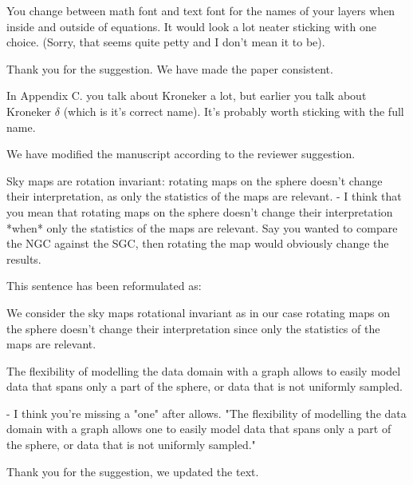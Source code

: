 \documentclass[12pt,a4paper]{article}
\newcommand{\nati}[1]{{\color[rgb]{.1,.6,.1}{NP: #1}}}
\newcommand{\1}{\b{1}}              %
\newcommand{\0}{\b{0}}              %
\begin{document}
\begin{mdframed}[style=comment]
You change between math font and text font for the names of your layers when inside and outside of equations. It would look a lot neater sticking with one choice. (Sorry, that seems quite petty and I don't mean it to be).
\end{mdframed}
Thank you for the suggestion. We have made the paper consistent.
\nati{@all, when you read the paper, please check that I did not forget some of them. Every layer has been changed to math symbols as we use them like function. For example, SM becomes $SM$.}

\begin{mdframed}[style=comment]
In Appendix C. you talk about Kroneker a lot, but earlier you talk about Kroneker $\delta$ (which is it's correct name). It's probably worth sticking with the full name.
\end{mdframed}
We have modified the manuscript according to the reviewer suggestion.

\begin{mdframed}[style=comment]
Sky maps are rotation invariant: rotating maps on the sphere doesn’t change their interpretation, as only the statistics of the maps are relevant.
- I think that you mean that rotating maps on the sphere doesn't change their interpretation *when* only the statistics of the maps are relevant. Say you wanted to compare the NGC against the SGC, then rotating the map would obviously change the results.
\end{mdframed}
This sentence has been reformulated as:
\begin{mdframed}[style=manuscript]
We consider the sky maps rotational invariant as in our case rotating maps on the sphere doesn't change their interpretation since only the statistics of the maps are relevant.
\end{mdframed}

\begin{mdframed}[style=comment]
The flexibility of modelling the data domain with a graph allows to easily model data that spans only a part of the sphere, or data that is not uniformly sampled.

- I think you're missing a "one" after allows. "The flexibility of modelling the data domain with a graph allows one to easily model data that spans only a part of the sphere, or data that is not uniformly sampled."
\end{mdframed}
Thank you for the suggestion, we updated the text.
\end{document}
